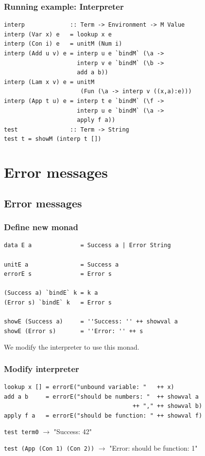\documentclass{beamer}
\begin{document}
\begin{frame}[t, fragile]
   \frametitle{Running example: Interpreter}

\begin{lstlisting}
interp             :: Term -> Environment -> M Value
interp (Var x) e   = lookup x e
interp (Con i) e   = unitM (Num i)
interp (Add u v) e = interp u e `bindM` (\a ->
                     interp v e `bindM` (\b ->
                     add a b))
interp (Lam x v) e = unitM 
                      (Fun (\a -> interp v ((x,a):e)))
interp (App t u) e = interp t e `bindM` (\f ->
                     interp u e `bindM` (\a ->
                     apply f a))
test               :: Term -> String
test t = showM (interp t [])
\end{lstlisting}
\end{frame}

\section{Error messages}
\subsection{Error messages}
\begin{frame}[t, fragile]
  \frametitle{Define new monad}

\begin{lstlisting}
data E a              = Success a | Error String

unitE a               = Success a
errorE s              = Error s

(Success a) `bindE` k = k a
(Error s) `bindE` k   = Error s

showE (Success a)     = ''Success: '' ++ showval a
showE (Error s)       = ''Error: '' ++ s
\end{lstlisting}

We modify the interpreter to use this monad.

\end{frame}

\begin{frame}[t, fragile]
  \frametitle{Modify interpreter}
\begin{lstlisting}
lookup x [] = errorE("unbound variable: "   ++ x)
add a b     = errorE("should be numbers: "  ++ showval a
                                     ++ "," ++ showval b)
apply f a   = errorE("should be function: " ++ showval f)
\end{lstlisting}

\texttt{test term0} $\rightarrow$ "Success: 42"

\texttt{test (App (Con 1) (Con 2))} $\rightarrow$ "Error: should be function: 1"

\end{frame}
\end{document}

